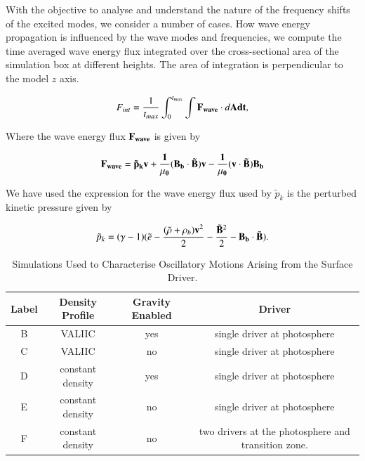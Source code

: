 \documentclass[authoryear,final,1p]{elsarticle}
\begin{document}
With the objective to analyse and understand the nature of the frequency shifts of the excited modes, we consider a number of cases.  How wave energy propagation is influenced by the wave modes and frequencies, we compute the time averaged wave energy flux integrated over the cross-sectional area of the simulation box at different heights. The area of integration is perpendicular to the model $z$ axis.

\begin{equation}\label{eqwaveenergyfluxintegral}
F_{int}= \frac{1}{t_{max}} \int_{0}^{t_{max}} \int         {\bf{F}_{wave}} \cdot d\bf{A}   dt   ,
\end{equation}

Where the wave energy flux $\bf{F}_{wave}$ is given by

\begin{equation}\label{eqwaveenergyflux}
\bf{F_{wave}}=\tilde{p}_{k} \bf{v}+\frac{1}{\mu_{0}}(\bf{B_{b}}\cdot \bf{\tilde{B}})\bf{v}-\frac{1}{\mu_{0}}(\bf{v}\cdot\bf{\tilde{B}})\bf{B_{b}}
\end{equation}

We have used the expression for the wave energy flux used by 
 $\tilde{p}_{k}$ is the perturbed kinetic pressure given by \citet{Bogdan2003}

\begin{equation}\label{eqperturbpk}
\tilde{p}_{k}=(\gamma - 1)( \tilde{e}-{{(\tilde{\rho} +\rho_{b})\bf v }^{2}\over{2}}-  {{\tilde{\bf{B}}}^{2}\over{2}}-{\bf{B}_{b}} \cdot  {\tilde{\bf{B}}}).
\end{equation}




\begin{table}
\centering
\begin{tabular}{c c c c }
\hline
Label   &  Density Profile & Gravity Enabled & Driver\\
\hline
B &  VALIIC & yes & single driver at photosphere & \\
\hline
C & VALIIC & no & single driver at photosphere &  \\
\hline
D & constant density & yes & single driver at photosphere &  \\
\hline
E & constant density & no & single driver at photosphere &  \\
\hline
F & constant density & no & two drivers at the photosphere and transition zone. &  \\
\hline
\end{tabular} 
\caption{Simulations Used to Characterise Oscillatory Motions Arising from the Surface Driver.}
\end{table}
\end{document}
